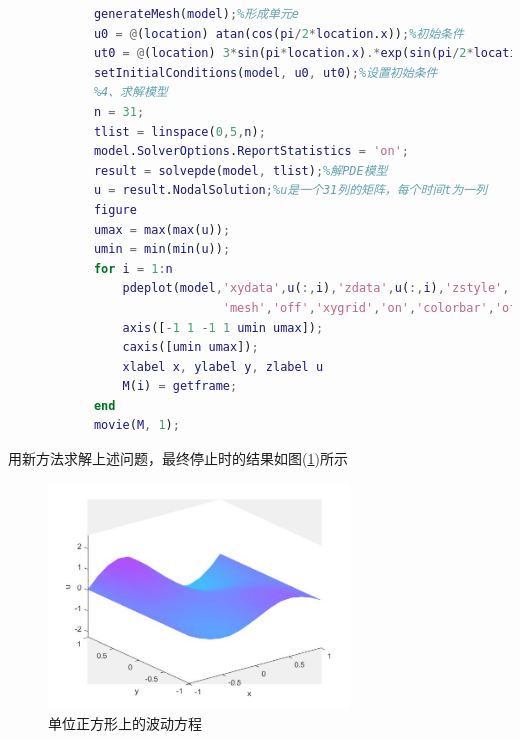\begin{lstlisting}[language = Matlab]
            %3、形成最终模型
            generateMesh(model);%形成单元e
            u0 = @(location) atan(cos(pi/2*location.x));%初始条件
            ut0 = @(location) 3*sin(pi*location.x).*exp(sin(pi/2*location.y));%初始条件
            setInitialConditions(model, u0, ut0);%设置初始条件
            %4、求解模型
            n = 31;
            tlist = linspace(0,5,n);
            model.SolverOptions.ReportStatistics = 'on';
            result = solvepde(model, tlist);%解PDE模型
            u = result.NodalSolution;%u是一个31列的矩阵，每个时间t为一列
            figure
            umax = max(max(u));
            umin = min(min(u));
            for i = 1:n
                pdeplot(model,'xydata',u(:,i),'zdata',u(:,i),'zstyle','continuous',...
                              'mesh','off','xygrid','on','colorbar','off');
                axis([-1 1 -1 1 umin umax]);
                caxis([umin umax]);
                xlabel x, ylabel y, zlabel u
                M(i) = getframe;
            end
            movie(M, 1);
            \end{lstlisting}
            用新方法求解上述问题，最终停止时的结果如图(\ref{单位正方形上的波动方程})所示
            \begin{figure}[H]
            \centering
            \includegraphics[width = 8cm]{images/PDE_example2_newmethod_jieguo.jpg}
            \caption{单位正方形上的波动方程}
            \label{单位正方形上的波动方程}
            \end{figure}
